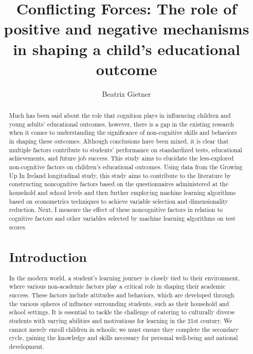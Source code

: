 \documentclass[a4paper]{article}
\begin{document}
\begin{titlepage}    
\title{Conflicting Forces: The role of positive and negative mechanisms in shaping a child's educational outcome}

\author{Beatriz Gietner}
\end{titlepage}

\maketitle

\thispagestyle{empty}

\begin{abstract}


 Much has been said about the role that cognition plays in influencing children and young adults' educational outcomes, however, there is a gap in the existing research when it comes to understanding the significance of non-cognitive skills and behaviors in shaping these outcomes. Although conclusions have been mixed, it is clear that multiple factors contribute to students' performance on standardized tests, educational achievements, and future job success. This study aims to elucidate the less-explored non-cognitive factors on children's educational outcomes. Using data from the Growing Up In Ireland longitudinal study, this study aims to contribute to the literature by constructing noncognitive factors based on the questionnaires administered at the household and school levels and then further employing machine learning algorithms based on econometrics techniques to achieve variable selection and dimensionality reduction. Next, I measure the effect of these noncognitive factors in relation to cognitive factors and other variables selected by machine learning algorithms on test scores.

\section{Introduction}

In the modern world, a student's learning journey is closely tied to their environment, where various non-academic factors play a critical role in shaping their academic success. These factors include attitudes and behaviors, which are developed through the various spheres of influence surrounding students, such as their household and school settings. It is essential to tackle the challenge of catering to culturally diverse students with varying abilities and motivations for learning in the 21st century. We cannot merely enroll children in schools; we must ensure they complete the secondary cycle, gaining the knowledge and skills necessary for personal well-being and national development.\\


\end{abstract}
\end{document}
